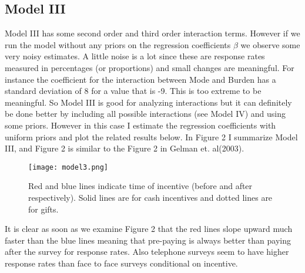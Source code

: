 \documentclass{article}
\begin{document}
\subsection{Model III}
Model III has some second order and third order interaction terms. However if we run the model without any priors on the regression coefficients $\beta$ we observe some very noisy estimates. A little noise is a lot since these are response rates measured in percentages (or proportions) and small changes are meaningful. For instance the coefficient for the interaction between Mode and Burden has a standard deviation of 8 for a value that is -9. This is too extreme to be meaningful. So Model III is good for analyzing interactions but it can definitely be done better by including all possible interactions (see Model IV) and using some priors. However in this case I estimate the regression coefficients with uniform priors and plot the related results below. In Figure 2 I summarize Model III, and Figure 2 is similar to the Figure 2 in Gelman et. al(2003).
 \begin{figure}[H]
\centering
\texttt{[image: model3.png]}
\caption{Red and blue lines indicate time of incentive (before and after respectively). Solid lines are for cash incentives and dotted lines are for gifts.}
\label{deltat}
\end{figure}
It is clear as soon as we examine Figure 2 that the red lines slope upward much faster than the blue lines meaning that pre-paying is always better than paying after the survey for response rates. Also telephone surveys seem to have higher response rates than face to face surveys conditional on incentive.
\end{document}
